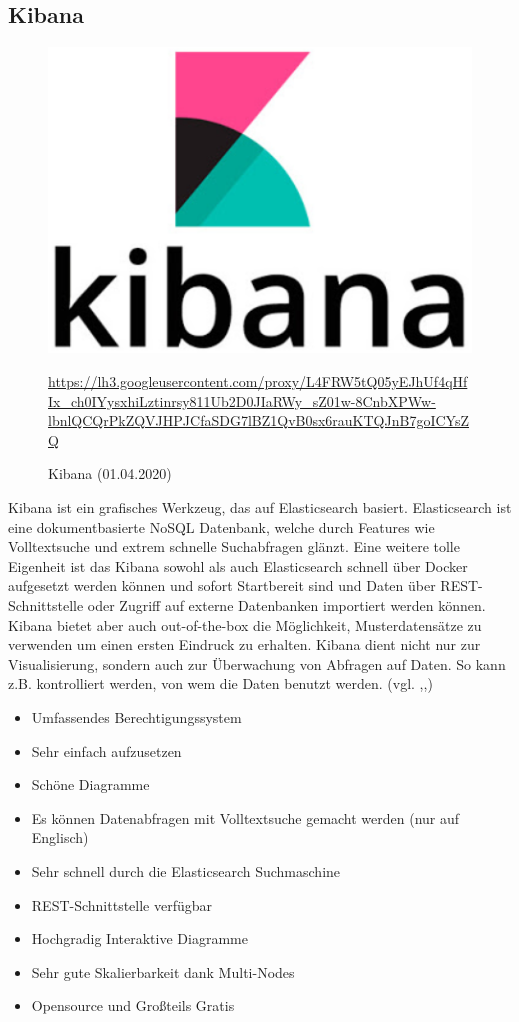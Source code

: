 \subsection{Kibana}\label{ssec:Kibana}
\begin{figure}[H]
    \includegraphics[scale=0.6]{images/kibanaLogo.PNG}
    \caption{Kibana (01.04.2020)}
     \centering
     \url{https://lh3.googleusercontent.com/proxy/L4FRW5tQ05yEJhUf4qHfIx_ch0IYysxhiLztinrsy811Ub2D0JIaRWy_sZ01w-8CnbXPWw-lbnlQCQrPkZQVJHPJCfaSDG7lBZ1QvB0sx6rauKTQJnB7goICYsZQ} 
\end{figure}
Kibana ist ein grafisches Werkzeug, das auf Elasticsearch basiert. Elasticsearch ist eine dokumentbasierte NoSQL Datenbank, welche durch Features wie Volltextsuche und extrem schnelle Suchabfragen glänzt. Eine weitere tolle Eigenheit ist das Kibana sowohl als auch Elasticsearch schnell über Docker aufgesetzt werden können und sofort Startbereit sind und Daten über REST-Schnittstelle oder Zugriff auf externe Datenbanken importiert werden können. Kibana bietet aber auch out-of-the-box die Möglichkeit, Musterdatensätze zu verwenden um einen ersten Eindruck zu erhalten. Kibana dient nicht nur zur Visualisierung, sondern auch zur Überwachung von Abfragen auf Daten. So kann z.B. kontrolliert werden, von wem die Daten benutzt werden. (vgl. \cite{noauthor_kibana_2015},\cite{noauthor_kibana:_2019},\cite{noauthor_indices_2019})
\begin{itemize}
\item Umfassendes Berechtigungssystem
\item Sehr einfach aufzusetzen
\item Schöne Diagramme
\item Es können Datenabfragen mit Volltextsuche gemacht werden (nur auf Englisch)
\item Sehr schnell durch die Elasticsearch Suchmaschine
\item REST-Schnittstelle verfügbar
\item Hochgradig Interaktive Diagramme
\item Sehr gute Skalierbarkeit dank Multi-Nodes
\item Opensource und Großteils Gratis
\end{itemize}
